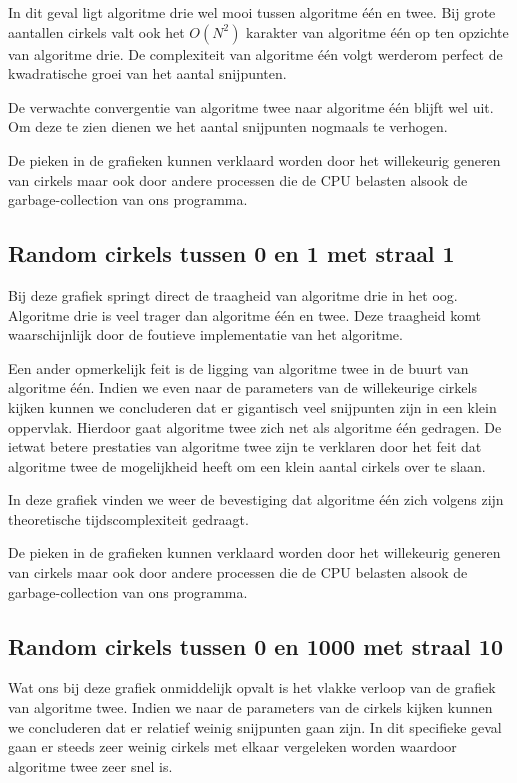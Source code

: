 \documentclass[11pt,a4paper]{article}
\begin{document}
In dit geval ligt algoritme drie wel mooi tussen algoritme \'e\'en en twee. Bij grote aantallen cirkels valt ook het $O(N^{2})$ karakter van algoritme \'e\'en op ten opzichte van algoritme drie. De complexiteit van algoritme \'e\'en volgt werderom perfect de kwadratische groei van het aantal snijpunten.

De verwachte convergentie van algoritme twee naar algoritme \'e\'en blijft wel uit. Om deze te zien dienen we het aantal snijpunten nogmaals te verhogen.

De pieken in de grafieken kunnen verklaard worden door het willekeurig generen van cirkels maar ook door andere processen die de CPU belasten alsook de garbage-collection van ons programma. 

\subsection{Random cirkels tussen 0 en 1 met straal 1}

Bij deze grafiek springt direct de traagheid van algoritme drie in het oog. Algoritme drie is veel trager dan algoritme \'e\'en en twee. Deze traagheid komt waarschijnlijk door de foutieve implementatie van het algoritme.

Een ander opmerkelijk feit is de ligging van algoritme twee in de buurt van algoritme \'e\'en. Indien we even naar de parameters van de willekeurige cirkels kijken kunnen we concluderen dat er gigantisch veel snijpunten zijn in een klein oppervlak. Hierdoor gaat algoritme twee zich net als algoritme \'e\'en gedragen. De ietwat betere prestaties van algoritme twee zijn te verklaren door het feit dat algoritme twee de mogelijkheid heeft om een klein aantal cirkels over te slaan.

In deze grafiek vinden we weer de bevestiging dat algoritme \'e\'en zich volgens zijn theoretische tijdscomplexiteit gedraagt.

De pieken in de grafieken kunnen verklaard worden door het willekeurig generen van cirkels maar ook door andere processen die de CPU belasten alsook de garbage-collection van ons programma. 

\subsection{Random cirkels tussen 0 en 1000 met straal 10}

Wat ons bij deze grafiek onmiddelijk opvalt is het vlakke verloop van de grafiek van algoritme twee. Indien we naar de parameters van de cirkels kijken kunnen we concluderen dat er relatief weinig snijpunten gaan zijn. In dit specifieke geval gaan er steeds zeer weinig cirkels met elkaar vergeleken worden waardoor algoritme twee zeer snel is.
\end{document}
